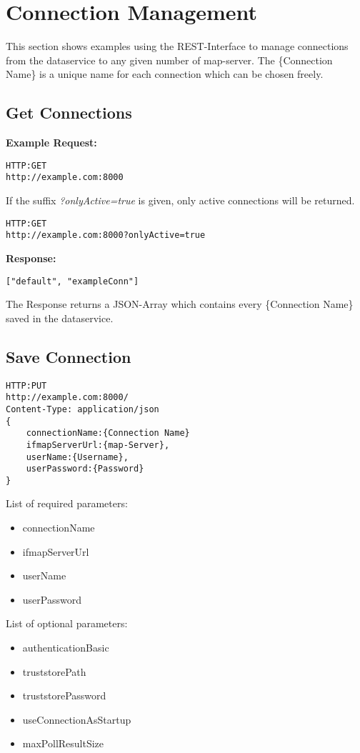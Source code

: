 \section{Connection Management}
This section shows examples using the REST-Interface to manage connections from the dataservice to any given number of map-server. The \{Connection Name\} is a unique name for each connection which can be chosen freely.

\subsection{Get Connections}
\textbf{Example Request:}
\begin{lstlisting}
HTTP:GET
http://example.com:8000
\end{lstlisting}

If the suffix \textit{?onlyActive=true} is given, only active connections will be returned.

\begin{lstlisting}
HTTP:GET
http://example.com:8000?onlyActive=true
\end{lstlisting}

\textbf{Response:}
\begin{lstlisting}
["default", "exampleConn"]
\end{lstlisting}
The Response returns a JSON-Array which contains every \{Connection Name\} saved in the dataservice. 

\subsection{Save Connection}
\begin{lstlisting}
HTTP:PUT
http://example.com:8000/
Content-Type: application/json
{
	connectionName:{Connection Name}
	ifmapServerUrl:{map-Server},
	userName:{Username},
	userPassword:{Password}
}
\end{lstlisting}
List of required parameters:
\begin{itemize}
\item connectionName
\item ifmapServerUrl
\item userName
\item userPassword
\end{itemize}
List of optional parameters:
\begin{itemize}
\item authenticationBasic
\item truststorePath
\item truststorePassword
\item useConnectionAsStartup
\item maxPollResultSize
\end{itemize}

